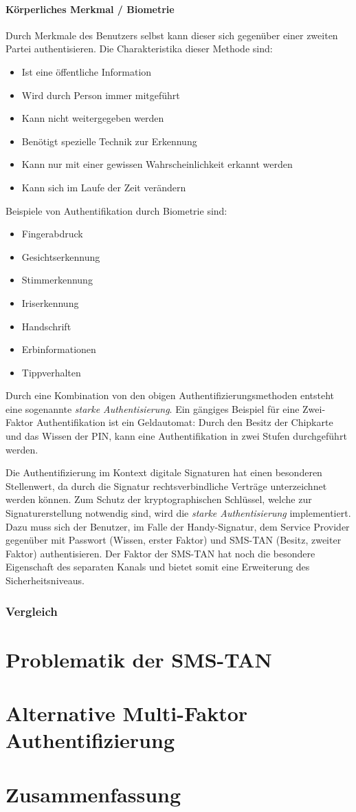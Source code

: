 \documentclass[11pt,a4paper,ngerman]{report}
\begin{document}
\subsubsection{Körperliches Merkmal / Biometrie}
Durch Merkmale des Benutzers selbst kann dieser sich gegenüber einer zweiten Partei authentisieren. Die Charakteristika dieser Methode sind:
\begin{itemize}
    \item Ist eine öffentliche Information
    \item Wird durch Person immer mitgeführt
    \item Kann nicht weitergegeben werden
    \item Benötigt spezielle Technik zur Erkennung
    \item Kann nur mit einer gewissen Wahrscheinlichkeit erkannt werden
    \item Kann sich im Laufe der Zeit verändern
\end{itemize}
Beispiele von Authentifikation durch Biometrie sind:
\begin{itemize}
    \item Fingerabdruck
    \item Gesichtserkennung
    \item Stimmerkennung
    \item Iriserkennung
    \item Handschrift
    \item Erbinformationen
    \item Tippverhalten
\end{itemize}
Durch eine Kombination von den obigen Authentifizierungsmethoden entsteht eine sogenannte \textit{starke Authentisierung}. Ein gängiges Beispiel für eine Zwei-Faktor Authentifikation ist ein Geldautomat: Durch den Besitz der Chipkarte und das Wissen der PIN, kann eine Authentifikation in zwei Stufen durchgeführt werden.

Die Authentifizierung im Kontext digitale Signaturen hat einen besonderen Stellenwert, da durch die Signatur rechtsverbindliche Verträge unterzeichnet werden können. Zum Schutz der kryptographischen Schlüssel, welche zur Signaturerstellung notwendig sind, wird die \textit{starke Authentisierung} implementiert. Dazu muss sich der Benutzer, im Falle der Handy-Signatur, dem Service Provider gegenüber mit Passwort (Wissen, erster Faktor) und SMS-TAN (Besitz, zweiter Faktor) authentisieren. Der Faktor der SMS-TAN hat noch die besondere Eigenschaft des separaten Kanals und bietet somit eine Erweiterung des Sicherheitsniveaus.

\subsection{Vergleich}


\chapter{Problematik der SMS-TAN}


\chapter{Alternative Multi-Faktor Authentifizierung}


\chapter{Zusammenfassung}


\end{document}
